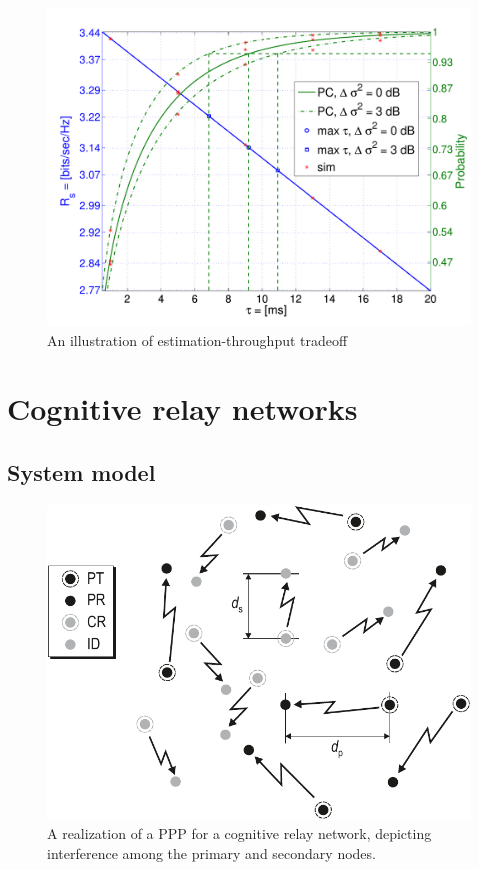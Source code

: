 \begin{figure}[!t]
\makeatletter
        \includegraphics[trim=0.6cm 0.4cm 0.2cm 1.2cm,clip=true,width=\columnwidth]{../kapitel04/figures/fig_thr_est_time_tradeoff_AWGN}
\caption{An illustration of estimation-throughput tradeoff}
\label{fig:ID_OC}
\end{figure}



\section{Cognitive relay networks}
\subsection{System model}

\begin{figure}[!t]
        \centering
        \includegraphics[trim=0.0cm 0.0cm 0.0cm 0.0cm,clip=true,width= 0.85 \columnwidth]{../kapitel04/figures/SGeometry}
        \caption{A realization of a PPP for a cognitive relay network, depicting interference among the primary and secondary nodes.} 
        \label{fig:Int_Sc}
\end{figure}
\cite{Kaushik_PIMRC}

